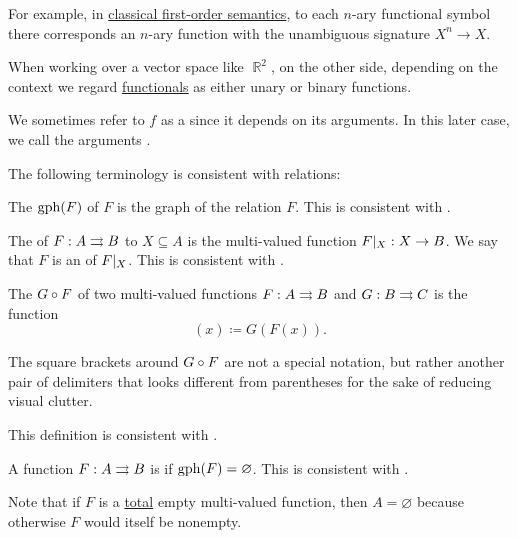 \begin{definition}
\begin{thmenum}[series=def:multi_valued_function]
    For example, in \hyperref[def:first_order_semantics]{classical first-order semantics}, to each \( n \)-ary functional symbol there corresponds an \( n \)-ary function with the unambiguous signature \( X^n \to X \).

    When working over a vector space like \( \BbbR^2 \), on the other side, depending on the context we regard \hyperref[rem:functional]{functionals} as either unary or binary functions.

    We sometimes refer to \( f \) as a  since it depends on its arguments. In this later case, we call the arguments .
  \end{thmenum}

  The following terminology is consistent with relations:
  \begin{thmenum}[resume=def:multi_valued_function]
     The  \( \operatorname{gph}(F) \) of \( F \) is the graph of the relation \( F \). This is consistent with .

     The  of \( F: A \rightrightarrows B \) to \( X \subseteq A \) is the multi-valued function \( F\vert_{X}: X \rightarrow B \). We say that \( F \) is an  of \( F\vert_{X} \). This is consistent with .

     The  \( G \bincirc F \) of two multi-valued functions \( F: A \rightrightarrows B \) and \( G: B \rightrightarrows C \) is the function
    \begin{equation*}
      [G \bincirc F](x) \coloneqq G(F(x)).
    \end{equation*}

    The square brackets around \( G \bincirc F \) are not a special notation, but rather another pair of delimiters that looks different from parentheses for the sake of reducing visual clutter.

    This definition is consistent with .

     A function \( F: A \rightrightarrows B \) is  if \( \operatorname{gph}(F) = \varnothing \). This is consistent with .

    Note that if \( F \) is a \hyperref[def:multi_valued_function/total]{total} empty multi-valued function, then \( A = \varnothing \) because otherwise \( F \) would itself be nonempty.
  \end{thmenum}


\end{definition}
